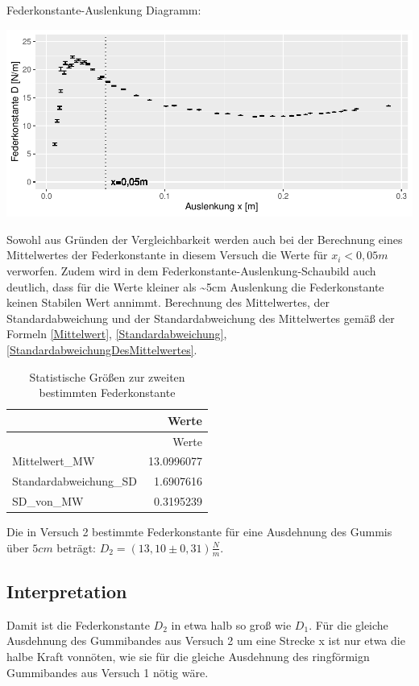 \documentclass[
  9pt,
]{article}
\begin{document}
Federkonstante-Auslenkung Diagramm:

\begin{center}\includegraphics{DehnbareStoffe_files/figure-latex/unnamed-chunk-15-1} \end{center}

Sowohl aus Gründen der Vergleichbarkeit werden auch bei der Berechnung
eines Mittelwertes der Federkonstante in diesem Versuch die Werte für
\(x_i<0,05m\) verworfen. Zudem wird in dem
Federkonstante-Auslenkung-Schaubild auch deutlich, dass für die Werte
kleiner als \textasciitilde5cm Auslenkung die Federkonstante keinen
Stabilen Wert annimmt. Berechnung des Mittelwertes, der
Standardabweichung und der Standardabweichung des Mittelwertes gemäß der
Formeln \ref{Mittelwert}, \ref{Standardabweichung},
\ref{StandardabweichungDesMittelwertes}.

\begin{longtable}[]{@{}lr@{}}
\caption{Statistische Größen zur zweiten bestimmten
Federkonstante}\tabularnewline
\toprule()
& Werte \\
\midrule()
\endfirsthead
\toprule()
& Werte \\
\midrule()
\endhead
Mittelwert\_MW & 13.0996077 \\
Standardabweichung\_SD & 1.6907616 \\
SD\_von\_MW & 0.3195239 \\
\bottomrule()
\end{longtable}

Die in Versuch 2 bestimmte Federkonstante für eine Ausdehnung des Gummis
über \(5cm\) beträgt: \(D_2=(13,10 \pm 0,31)\frac{N}{m}\).

\hypertarget{interpretation}{%
\subsection{Interpretation}\label{interpretation}}

Damit ist die Federkonstante \(D_2\) in etwa halb so groß wie \(D_1\).
Für die gleiche Ausdehnung des Gummibandes aus Versuch 2 um eine Strecke
x ist nur etwa die halbe Kraft vonnöten, wie sie für die gleiche
Ausdehnung des ringförmign Gummibandes aus Versuch 1 nötig wäre.
\end{document}
